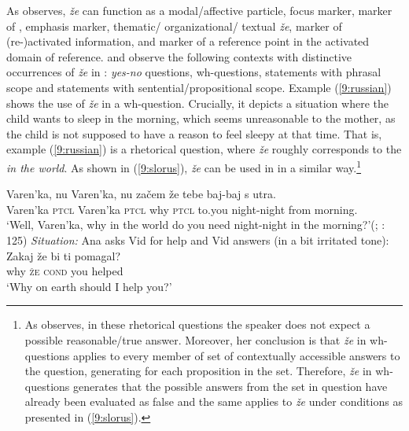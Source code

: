 \documentclass[output=paper,modfonts,newtxmath,hidelinks]{langscibook}
\begin{document}
\noindent As \cite{mccoy2003} observes,  \textit{že} can function as a modal/affective particle, focus marker, marker of , emphasis marker, thematic/ organizational/ textual \textit{že}, marker of (re-)activated information, and marker of a reference point in the activated domain of reference. \citet{hagstrommccoy2003} and \cite{mccoy2003} observe the following contexts with distinctive occurrences of \textit{že} in : \textit{yes-no} questions, wh-questions, statements with phrasal scope and statements with sentential/propositional scope. Example (\ref{9:russian}) shows the use of \textit{že} in a wh-question. Crucially, it depicts a situation where the child wants to sleep in the morning, which seems unreasonable to the mother, as the child is not supposed to have a reason to feel sleepy at that time. That is, example (\ref{9:russian}) is a rhetorical question, where \textit{že} roughly corresponds to the  \textit{in the world}. As shown in (\ref{9:slorus}), \textit{že} can be used in  in a similar way.\footnote{As \cite{mccoy2003} observes, in these rhetorical questions the speaker does not expect a possible reasonable/true answer. Moreover, her conclusion is that \textit{že} in wh-questions applies to every member of set of contextually accessible answers to the question, generating  for each proposition in the set. Therefore,  \textit{že} in wh-questions generates  that the possible answers from the set in question have already been evaluated as false and the same applies to  \textit{že} under conditions as presented in (\ref{9:slorus}).}

\begin{exe}
\ex\gll Varen'ka, nu Varen'ka, nu začem že tebe baj-baj s utra. \\
Varen'ka \textsc{ptcl} Varen'ka \textsc{ptcl} why \textsc{ptcl} to.you night-night from morning.\\
\glt `Well, Varen'ka, why in the world do you need night-night in the morning?'\hfill(; \citealt{mccoy2003}: 125) \label{9:russian}
\ex \textit{Situation:} Ana asks Vid for help and Vid answers (in a bit irritated tone): \label{9:slorus} \\
\gll Zakaj že bi ti pomagal? \\
	why \textsc{že}  \textsc{cond} you helped \\
\trans `Why on earth should I help you?'
\end{exe}
\end{document}
